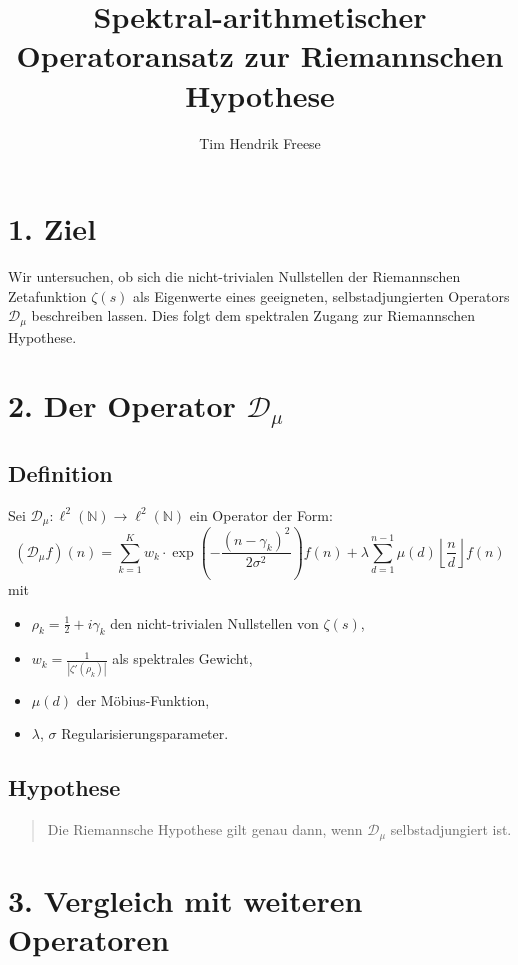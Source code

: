 \documentclass[12pt]{article}
\title{\textbf{Spektral-arithmetischer Operatoransatz zur Riemannschen Hypothese}}
\author{Tim Hendrik Freese}
\date{}
\begin{document}
\maketitle

\section*{1. Ziel}
Wir untersuchen, ob sich die nicht-trivialen Nullstellen der Riemannschen Zetafunktion \(\zeta(s)\) als Eigenwerte eines geeigneten, selbstadjungierten Operators \(\mathcal{D}_\mu\) beschreiben lassen. Dies folgt dem spektralen Zugang zur Riemannschen Hypothese.

\section*{2. Der Operator \(\mathcal{D}_\mu\)}

\subsection*{Definition}
Sei \(\mathcal{D}_\mu : \ell^2(\mathbb{N}) \rightarrow \ell^2(\mathbb{N})\) ein Operator der Form:
\[
(\mathcal{D}_\mu f)(n) = \sum_{k=1}^{K} w_k \cdot \exp\left( -\frac{(n - \gamma_k)^2}{2\sigma^2} \right) f(n) + \lambda \sum_{d=1}^{n-1} \mu(d) \left\lfloor \frac{n}{d} \right\rfloor f(n)
\]
mit
\begin{itemize}
  \item \(\rho_k = \frac{1}{2} + i\gamma_k\) den nicht-trivialen Nullstellen von \(\zeta(s)\),
  \item \(w_k = \frac{1}{|\zeta'(\rho_k)|}\) als spektrales Gewicht,
  \item \(\mu(d)\) der Möbius-Funktion,
  \item \(\lambda\), \(\sigma\) Regularisierungsparameter.
\end{itemize}

\subsection*{Hypothese}
\begin{quote}
Die Riemannsche Hypothese gilt genau dann, wenn \(\mathcal{D}_\mu\) selbstadjungiert ist.
\end{quote}

\section*{3. Vergleich mit weiteren Operatoren}
\end{document}
